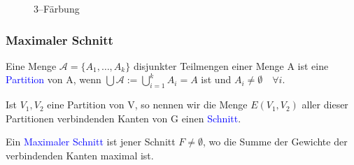 \begin{figure}[h]
\begin{center}
\caption[3--Färbung]{3--Färbung}
  \label{Faerbung}
\end{center}
\end{figure}


\subsubsection*{Maximaler Schnitt}

\begin{definition}
Eine Menge $\mathcal{A} = \{A_1,\ldots,A_k\}$ disjunkter Teilmengen einer Menge A ist eine \textcolor{blue}{Partition} von A, wenn $\bigcup \mathcal{A} := \bigcup_{i=1}^k A_i = A$ ist und $A_i \neq \emptyset \quad \forall i$. \cite{Diestel}  
\end{definition}

\begin{definition}
Ist ${V_1,V_2}$ eine Partition von V, so nennen wir die Menge $E(V_1,V_2)$ aller dieser Partitionen verbindenden Kanten von G einen \textcolor{blue}{Schnitt}.  \cite{Diestel} 
\end{definition}

\begin{definition}
Ein \textcolor{blue}{Maximaler Schnitt} ist jener Schnitt $F \neq \emptyset$, wo die Summe der Gewichte der verbindenden Kanten maximal ist. \cite{Diestel}
\end{definition}


